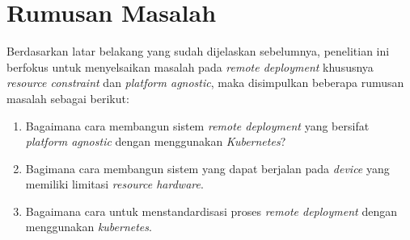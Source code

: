 \section{Rumusan Masalah}

Berdasarkan latar belakang yang sudah dijelaskan sebelumnya, penelitian ini berfokus untuk menyelsaikan masalah pada \textit{remote deployment} khususnya \textit{resource constraint} dan \textit{platform agnostic}, maka disimpulkan beberapa rumusan masalah sebagai berikut:

\begin{enumerate}
  \item Bagaimana cara membangun sistem \textit{remote deployment} yang bersifat \textit{platform agnostic} dengan menggunakan \textit{Kubernetes}?
  \item Bagimana cara membangun sistem yang dapat berjalan pada \textit{device} yang memiliki limitasi \textit{resource hardware}.
  \item Bagaimana cara untuk menstandardisasi proses \textit{remote deployment} dengan menggunakan \textit{kubernetes}.
\end{enumerate}